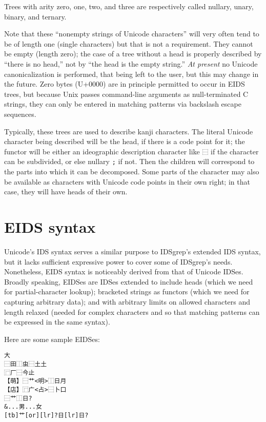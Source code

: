 \documentclass[twocolumn]{report}
\begin{document}
Trees with arity zero, one, two, and three are respectively called
nullary, unary, binary, and ternary.

Note that these ``nonempty strings of Unicode characters'' will very often
tend to be of length one (single characters) but that is not a requirement. 
They cannot be empty (length zero); the case of a tree without a head is
properly described by ``there is no head,'' not by ``the head is the empty
string.'' \emph{At present} no Unicode canonicalization is performed, that
being left to the user, but this may change in the future.  Zero bytes
(U+0000) are in principle permitted to occur in EIDS trees, but because
Unix passes command-line arguments as null-terminated C strings, they can
only be entered in matching patterns via backslash escape sequences.

Typically, these trees are used to describe kanji characters.  The literal
Unicode character being described will be the head, if there is a code point
for it; the functor will be either an ideographic description character like
\texttt{⿱} if the character can be subdivided, or else nullary \texttt{;}
if not.  Then the children will correspond to the parts into which it can be
decomposed.  Some parts of the character may also be available as
characters with Unicode code points in their own right; in that case, they
will have heads of their own.


\section{EIDS syntax}

Unicode's IDS syntax serves a similar purpose to IDSgrep's extended IDS
syntax, but it lacks sufficient expressive power to cover some of IDSgrep's
needs.  Nonetheless, EIDS syntax is noticeably derived from that of Unicode
IDSes.  Broadly speaking, EIDSes are IDSes extended to include heads (which
we need for partial-character lookup); bracketed strings as functors (which
we need for capturing arbitrary data); and with arbitrary limits on allowed
characters and length relaxed (needed for complex characters and so that
matching patterns can be expressed in the same syntax).

Here are some sample EIDSes:
\begin{verbatim}
大
⿱田⿰虫⿱土土
⿸厂⿱今止
【萌】⿱艹<明>⿰日月
【店】⿸广<占>⿱卜口 
⿱艹⿰日?
&...男...女
[tb]艹[or][lr]?日[lr]日?
\end{verbatim}
\end{document}
